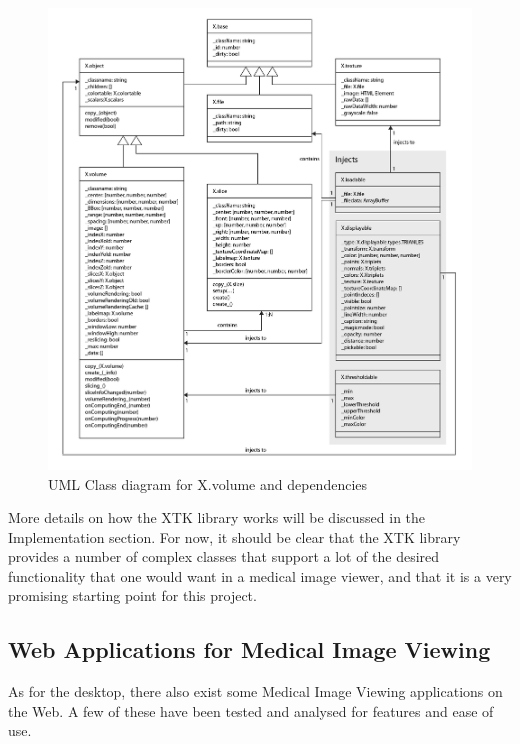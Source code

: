 \documentclass[a4paper,11pt,twoside]{article}
\begin{document}
\begin{figure}[ht!]
\centering
\includegraphics[width=170mm]{graphics/xtkUML_04.png}
\caption{UML Class diagram for X.volume and dependencies}
\label{fig:xtkVolume}
\end{figure}


More details on how the XTK library works will be discussed in the Implementation section. For now, it should be clear that the XTK library provides a number of complex classes that support a lot of the desired functionality that one would want in a medical image viewer, and that it is a very promising starting point for this project.



\subsection{Web Applications for Medical Image Viewing}

As for the desktop, there also exist some Medical Image Viewing applications on the Web. A few of these have been tested and analysed for features and ease of use.
\end{document}
